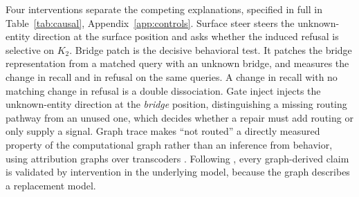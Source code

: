 \documentclass{article}
\begin{document}
Four interventions separate the competing explanations, specified in full in
Table~\ref{tab:causal}, Appendix~\ref{app:controls}. Surface steer steers the unknown-entity direction at the
surface position and asks whether the induced refusal is selective on $K_2$. Bridge patch is the decisive
behavioral test. It patches the bridge representation from a matched query with an unknown bridge, and
measures the change in recall and in refusal on the same queries. A change in recall with no
matching change in refusal is a double dissociation. Gate inject injects the unknown-entity direction at the
\emph{bridge} position, distinguishing a missing routing pathway from an unused one, which decides
whether a repair must add routing or only supply a signal. Graph trace makes ``not routed'' a directly
measured property of the computational graph rather than an inference from behavior, using
attribution graphs over transcoders \citep{ameisen2025circuittracing,hanna2025circuittracer}.
Following \citet{lindsey2025biology}, every graph-derived claim is validated by intervention in the
underlying model, because the graph describes a replacement model.
\end{document}
